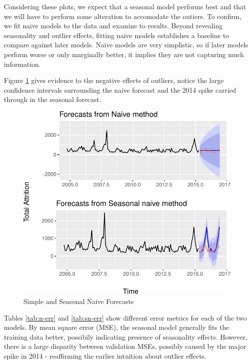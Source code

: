 \documentclass[12pt,letterpaper,toc=flat,oneside]{report}
\theoremstyle{definition}
\theoremstyle{definition}
\theoremstyle{definition}
\theoremstyle{remark}
\begin{document}
Considering these plots, we expect that a seasonal model performs best
and that we will have to perform some alteration to accomodate the
outiers. To confirm, we fit naive models to the data and examine to
results. Beyond revealing seasonality and outlier effects, fitting naive
models establishes a baseline to compare against later models. Naive
models are very simplistic, so if later models perform worse or only
marginally better, it implies they are not capturing much information.

Figure \ref{fig:n-sn-forecast} gives evidence to the negative effects of
outliers, notice the large confidence intervals surrounding the naive
forecast and the 2014 spike carried through in the seasonal forecast.

\begin{figure}[H]

{\centering \includegraphics{elliott-econometric-personnel-retention-18_files/figure-latex/n-sn-forecast-1} 

}

\caption{Simple and Seasonal Naive Forecasts}\label{fig:n-sn-forecast}
\end{figure}

Tables \ref{tab:n-err} and \ref{tab:sn-err} show different error metrics
for each of the two models. By mean square error (MSE), the seasonal
model generally fits the training data better, possibily indicating
presence of seasonality effects. However, there is a large disparity
between validation MSEs, possibly caused by the major spike in 2014 -
reaffirming the earlier intuition about outlier effects.
\end{document}
